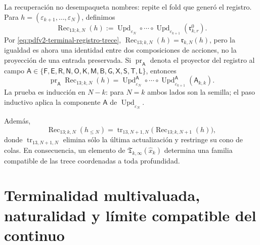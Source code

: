 La recuperaci\'on no desempaqueta nombres: repite el fold que gener\'o el
registro. Para
\(h=(\varepsilon_{k+1},\ldots,\varepsilon_N)\), definimos
\begin{equation}
\label{eq:pdfv2-terminal-recuperacion-trece}
 \boxed{
 \operatorname{Rec}_{13;k,N}(h):=
 \operatorname{Upd}_{\varepsilon_N}\circ\cdots\circ
 \operatorname{Upd}_{\varepsilon_{k+1}}
 (\mathfrak r^0_{k,r}).}
\end{equation}
Por \eqref{eq:pdfv2-terminal-registro-trece},
\(\operatorname{Rec}_{13;k,N}(h)=\mathfrak r_{k,N}(h)\), pero la igualdad
es ahora una identidad entre dos composiciones de acciones, no la
proyecci\'on de una entrada preservada. Si
\(\operatorname{pr}_{\mathsf A}\) denota el proyector del registro al campo
\(\mathsf A\in\{\mathsf F,\mathsf E,\mathsf R,\mathsf N,\mathsf O,
\mathsf K,\mathsf M,\mathsf B,\mathsf G,\mathsf X,\mathsf S,\mathsf T,
\mathsf L\}\), entonces
\begin{equation}
\label{eq:pdfv2-terminal-recuperacion-campo-fold}
 \operatorname{pr}_{\mathsf A}\operatorname{Rec}_{13;k,N}(h)
 =\operatorname{Upd}^{\mathsf A}_{\varepsilon_N}\circ\cdots\circ
  \operatorname{Upd}^{\mathsf A}_{\varepsilon_{k+1}}
  (\mathsf A_{k,k}).
\end{equation}
La prueba es inducci\'on en \(N-k\): para \(N=k\) ambos lados son la
semilla; el paso inductivo aplica la componente \(\mathsf A\) de
\(\operatorname{Upd}_{\varepsilon_N}\).

Adem\'as,
\begin{equation}
\label{eq:pdfv2-terminal-recuperacion-compatible}
 \operatorname{Rec}_{13;k,N}(h_{\leq N})
 =\operatorname{tr}_{13,N+1,N}
   \bigl(\operatorname{Rec}_{13;k,N+1}(h)\bigr),
\end{equation}
donde \(\operatorname{tr}_{13,N+1,N}\) elimina s\'olo la \'ultima
actualizaci\'on y restringe su cono de colas. En consecuencia, un elemento
de \(\mathfrak T_{k,\infty}(\widehat x_k)\) determina una familia compatible de las
trece coordenadas a toda profundidad.

\section{Terminalidad multivaluada, naturalidad y límite compatible del continuo}

